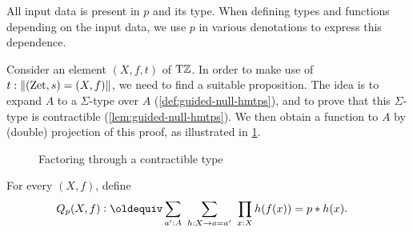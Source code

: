 \documentclass[a4,12pt]{amsart}
\begin{document}
All input data is present in $p$ and its type.
When defining types and functions depending on the input data, 
we use $p$ in various denotations to express this dependence. 

Consider an element $(X,f,t)$ of ${\mathrm{T}\mathbb{Z}}$.
In order to make use of $t:\lVert(\mathrm{Zet},s)=(X,f)\rVert$, 
we need to find a suitable proposition.
The idea is to expand $A$ to a $\Sigma$-type over $A$
(\cref{def:guided-null-hmtps}), 
and to prove that this $\Sigma$-type is contractible
(\cref{lem:guided-null-hmtps}).
We then obtain a function to $A$ by (double) projection
of this proof, as illustrated in \cref{fig:TorZ-recursion}.

\begin{figure}
\caption{\label{fig:TorZ-recursion}Factoring through a contractible type}
\end{figure}

\begin{definition}\label{def:guided-null-hmtps}
For every $(X,f)$, define
\begin{align*}\label{eq:TBD}
Q_p(X,f)&\defeq \sum_{a':A}~\sum_{h:X\to a=a'}~\prod_{x:X} h(f(x))=p\ct h(x).
\end{align*}
\end{definition}
\end{document}
